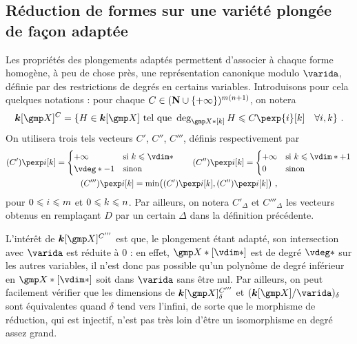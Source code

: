 
\subsection{Réduction de formes sur une variété plongée de façon adaptée}
\label{sec:rfull}

Les propriétés des plongements adaptés permettent d'associer à chaque forme
homogène, à peu de chose près, une représentation canonique modulo \( \varida
\), définie par des restrictions de degrés en certains variables.
Introduisons pour cela quelques notations : pour chaque \( C \in ({\mathbf{N}} \cup
  \lbrace +\infty \rbrace) ^{m(n+1)} \), on notera
\begin{equation} \label{e:C-spaces}
  \cdn[\vmp]^C
  = \{
    H \in \cdn[\vmp]
    \text{ tel que }
    \deg_{\vmp*[k]} H \le C\pexp{\fct}[k]
    \quad \forall i, k
    \}
  \pmm.
\end{equation}
On utilisera trois tels vecteurs \( C' \), \( C'' \), \( C''' \), définis
respectivement par
\begin{gather} \label{e:C-i-iii}
  (C')\pexp\fct[\ind] =
  \begin{cases}
    +\infty & \text{si \( \ind \le \vdim* \)} \\
    \vdeg* - 1 & \text{sinon}
  \end{cases}
  \qquad
  (C'')\pexp\fct[\ind] =
  \begin{cases}
    +\infty & \text{si \( \ind \le \vdim* + 1 \)} \\
    0 & \text{sinon}
  \end{cases}
  \\
  (C''')\pexp\fct[\ind] = \min\bigl(
    (C')\pexp\fct[\ind], (C'')\pexp\fct[\ind]
  \bigr)
  \pmm,
\end{gather}
pour \( 0 \leqslant i \leqslant m \) et \( 0 \leqslant k \leqslant n \).  Par ailleurs, on
notera \( C'_\Delta \) et \( C'''_\Delta \) les vecteurs obtenus en remplaçant
\( D \) par un certain \( \Delta \) dans la définition précédente.

L'intérêt de \( \cdn[ \vmp ]^{C'''} \) est que, le plongement étant
adapté, son intersection avec \( \varida \) est réduite à \( 0 \) : en effet,
\( \vmp*[\vdim*] \) est de degré \( \vdeg* \) sur les autres variables, il
n'est donc pas possible qu'un polynôme de degré inférieur en \( \vmp*[\vdim*]
\) soit dans \( \varida \) sans être nul. Par ailleurs, on peut facilement
vérifier que les dimensions de \( \cdn[ \vmp ]^{C'''}_{\delta} \) et \(
  ( \cdn[\vmp] / \varida )_\delta \) sont équivalentes quand \( \delta \) tend
vers l'infini, de sorte que le morphisme de réduction, qui est injectif, n'est
pas très loin d'être un isomorphisme en degré assez grand.

